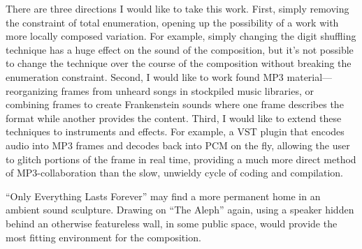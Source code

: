 \documentclass{thesis}
\begin{document}
There are three directions I would like to take this work. First, simply removing the constraint of total enumeration, opening up the possibility of a work with more locally composed variation. For example, simply changing the digit shuffling technique has a huge effect on the sound of the composition, but it's not possible to change the technique over the course of the composition without breaking the enumeration constraint. Second, I would like to work found MP3 material---reorganizing frames from unheard songs in stockpiled music libraries, or combining frames to create Frankenstein sounds where one frame describes the format while another provides the content. Third, I would like to extend these techniques to instruments and effects. For example, a VST plugin that encodes audio into MP3 frames and decodes back into PCM on the fly, allowing the user to glitch portions of the frame in real time, providing a much more direct method of MP3-collaboration than the slow, unwieldy cycle of coding and compilation.

``Only Everything Lasts Forever'' may find a more permanent home in an ambient sound sculpture. Drawing on ``The Aleph'' again, using a speaker hidden behind an otherwise featureless wall, in some public space, would provide the most fitting environment for the composition.

\begin{singlespace}

\end{singlespace}
\end{document}

